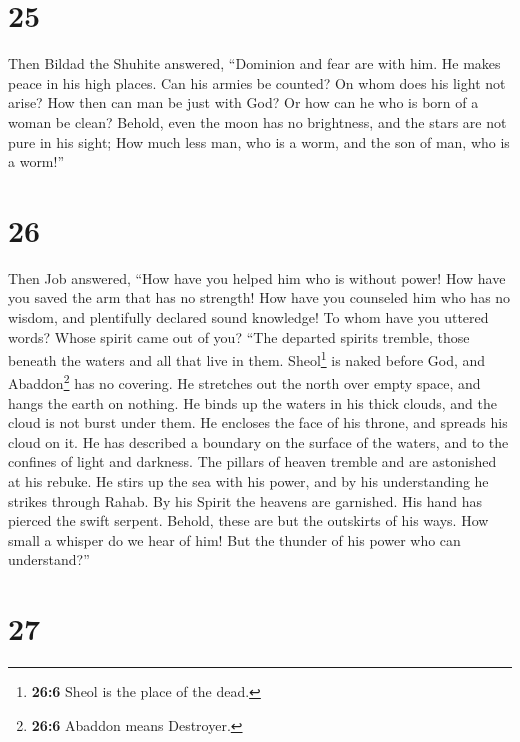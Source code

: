 \hypertarget{section-24}{%
\section{25}\label{section-24}}

 Then Bildad the Shuhite answered, 
``Dominion and fear are with him. He makes peace in his high places.
 Can his armies be counted? On whom does his light not
arise?  How then can man be just with God? Or how can he
who is born of a woman be clean?  Behold, even the moon
has no brightness, and the stars are not pure in his sight;
 How much less man, who is a worm, and the son of man, who
is a worm!''

\hypertarget{section-25}{%
\section{26}\label{section-25}}

 Then Job answered,  ``How have you helped
him who is without power! How have you saved the arm that has no
strength!  How have you counseled him who has no wisdom,
and plentifully declared sound knowledge!  To whom have
you uttered words? Whose spirit came out of you?  ``The
departed spirits tremble, those beneath the waters and all that live in
them.  Sheol\footnote{\textbf{26:6} Sheol is the place of
  the dead.} is naked before God, and Abaddon\footnote{\textbf{26:6}
  Abaddon means Destroyer.} has no covering.  He stretches
out the north over empty space, and hangs the earth on nothing.
 He binds up the waters in his thick clouds, and the cloud
is not burst under them.  He encloses the face of his
throne, and spreads his cloud on it.  He has described a
boundary on the surface of the waters, and to the confines of light and
darkness.  The pillars of heaven tremble and are
astonished at his rebuke.  He stirs up the sea with his
power, and by his understanding he strikes through Rahab.
 By his Spirit the heavens are garnished. His hand has
pierced the swift serpent.  Behold, these are but the
outskirts of his ways. How small a whisper do we hear of him! But the
thunder of his power who can understand?''

\hypertarget{section-26}{%
\section{27}\label{section-26}}

